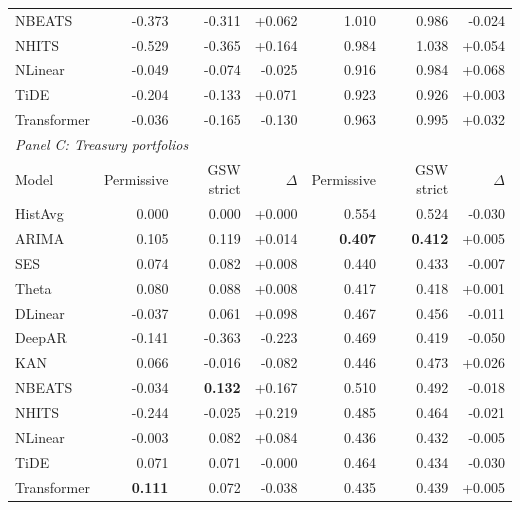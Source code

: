 \begin{tabular}{lrrrrrr}
NBEATS & -0.373 & -0.311 & +0.062 & 1.010 & 0.986 & -0.024 \\
NHITS & -0.529 & -0.365 & +0.164 & 0.984 & 1.038 & +0.054 \\
NLinear & -0.049 & -0.074 & -0.025 & 0.916 & 0.984 & +0.068 \\
TiDE & -0.204 & -0.133 & +0.071 & 0.923 & 0.926 & +0.003 \\
Transformer & -0.036 & -0.165 & -0.130 & 0.963 & 0.995 & +0.032 \\
\midrule
\multicolumn{7}{l}{\textit{Panel C: Treasury portfolios}} \\
\midrule
Model & Permissive & GSW strict & $\Delta$ & Permissive & GSW strict & $\Delta$ \\
\midrule
HistAvg & 0.000 & 0.000 & +0.000 & 0.554 & 0.524 & -0.030 \\
ARIMA & 0.105 & 0.119 & +0.014 & \textbf{0.407} & \textbf{0.412} & +0.005 \\
SES & 0.074 & 0.082 & +0.008 & 0.440 & 0.433 & -0.007 \\
Theta & 0.080 & 0.088 & +0.008 & 0.417 & 0.418 & +0.001 \\
DLinear & -0.037 & 0.061 & +0.098 & 0.467 & 0.456 & -0.011 \\
DeepAR & -0.141 & -0.363 & -0.223 & 0.469 & 0.419 & -0.050 \\
KAN & 0.066 & -0.016 & -0.082 & 0.446 & 0.473 & +0.026 \\
NBEATS & -0.034 & \textbf{0.132} & +0.167 & 0.510 & 0.492 & -0.018 \\
NHITS & -0.244 & -0.025 & +0.219 & 0.485 & 0.464 & -0.021 \\
NLinear & -0.003 & 0.082 & +0.084 & 0.436 & 0.432 & -0.005 \\
TiDE & 0.071 & 0.071 & -0.000 & 0.464 & 0.434 & -0.030 \\
Transformer & \textbf{0.111} & 0.072 & -0.038 & 0.435 & 0.439 & +0.005 \\
\bottomrule
\end{tabular}
